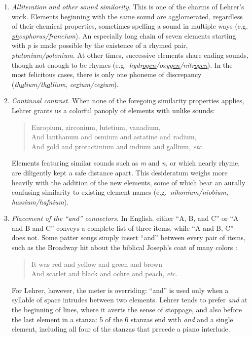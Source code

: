 \documentclass{article}
\begin{document}
\begin{enumerate}
  \item \emph{Alliteration and other sound similarity.} This is one of the charms of Lehrer's work. Elements beginning with the same sound are agglomerated, regardless of their chemical properties, sometimes spelling a sound in multiple ways (e.g. \emph{\underline{ph}osphorus/\underline{f}rancium}). An especially long chain of seven elements starting with \emph{p} is made possible by the existence of a rhymed pair, \emph{plutonium/polonium.} At other times, successive elements share ending sounds, though not enough to be rhymes (e.g.\ \emph{hydr\underline{ogen}/ox\underline{ygen}/nitr\underline{ogen}}). In the most felicitous cases, there is only one phoneme of discrepancy (\emph{th\underline{u}lium/th\underline{a}llium}, \emph{ce\underline{r}ium/ce\underline{s}ium}).
  
  \item \emph{Continual contrast.} When none of the foregoing similarity properties applies, Lehrer grants us a colorful panoply of elements with unlike sounds:
  \begin{verse}
    Europium, zirconium, lutetium, vanadium,\\
    And lanthanum and osmium and astatine and radium,\\
    And gold and protactinium and indium and gallium, \emph{etc.}
  \end{verse}
  Elements featuring similar sounds such as \emph{m} and \emph{n}, or which nearly rhyme, are diligently kept a safe distance apart. This desideratum weighs more heavily with the addition of the new elements, some of which bear an aurally confusing similarity to existing element names (e.g.\ \emph{nihonium/niobium, hassium/hafnium}).
  
  \item \emph{Placement of the ``and'' connectors.} In English, either ``A, B, and C'' or ``A and B and C'' conveys a complete list of three items, while ``A and B, C'' does not. Some patter songs simply insert ``and'' between every pair of items, such as the Broadway hit about the biblical Joseph's coat of many colors \citep{JosephsCoat}:
  \begin{verse}
    It was red and yellow and green and brown\\
    And scarlet and black and ochre and peach, \emph{etc.}
  \end{verse}
  For Lehrer, however, the meter is overriding: ``and'' is used only when a syllable of space intrudes between two elements. Lehrer tends to prefer \emph{and} at the beginning of lines, where it averts the sense of stoppage, and also before the last element in a stanza: 5 of the 6 stanzas end with \emph{and} and a single element, including all four of the stanzas that precede a piano interlude.
  

\end{enumerate}
\end{document}
